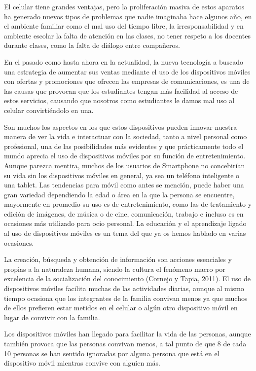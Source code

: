 \documentclass[10pt,a4paper]{article}
\begin{document}
El celular tiene grandes ventajas, pero la proliferaci{\'o}n masiva de estos aparatos ha generado nuevos tipos de problemas que nadie imaginaba hace algunos a{\~n}o, en el ambiente familiar como el mal uso del tiempo libre, la irresponsabilidad y en ambiente escolar la falta de atenci{\'o}n en las clases, no tener respeto a los docentes durante clases, como la falta de di{\'a}logo entre compa{\~n}eros.

En el pasado como hasta ahora en la actualidad, la nueva tecnolog{\'i}a a buscado una estrategia de aumentar sus ventas mediante el uso de los dispositivos m{\'o}viles con ofertas y promociones que ofrecen las empresas de comunicaciones, es una de las causas que provocan que los estudiantes tengan m{\'a}s facilidad al acceso de estos servicios, causando que nosotros como estudiantes le damos mal uso al celular convirti{\'e}ndolo en una. 

Son muchos los aspectos en los que estos dispositivos pueden innovar nuestra manera de ver la vida e interactuar con la sociedad, tanto a nivel personal como profesional, una de las posibilidades m{\'a}s evidentes y que pr{\'a}cticamente todo el mundo aprecia el uso de dispositivos m{\'o}viles por su funci{\'o}n de entretenimiento. Aunque parezca mentira, muchos de los usuarios de Smartphone no concebir{\'i}an su vida sin los dispositivos m{\'o}viles en general, ya sea un tel{\'e}fono inteligente o una tablet. Las tendencias  para m{\'o}vil como antes se menci{\'o}n, puede haber una gran variedad dependiendo la edad o {\'a}rea en la que la persona se encuentre,  mayormente en promedio su uso es de entretenimiento, como las de tratamiento y edici{\'o}n de im{\'a}genes, de m{\'u}sica o de cine, comunicaci{\'o}n, trabajo e incluso es en ocasiones m{\'a}s utilizado para ocio personal. La educaci{\'o}n y el aprendizaje ligado al uso de dispositivos m{\'o}viles es un tema del que ya os hemos hablado en varias ocasiones.

La creaci{\'o}n, b{\'u}squeda y obtenci{\'o}n de informaci{\'o}n son acciones esenciales y propias a la naturaleza humana, siendo la cultura el fen{\'o}meno macro por excelencia de la socializaci{\'o}n del conocimiento (Cornejo y Tapia, 2011).
El uso de dispositivos m{\'o}viles facilita muchas de las actividades diarias, aunque al mismo tiempo ocasiona que los integrantes de la familia convivan menos ya que muchos de ellos prefieren estar metidos en el celular o alg{\'u}n otro dispositivo m{\'o}vil en lugar de convivir con la familia.

Los dispositivos m{\'o}viles han llegado para facilitar la vida de las personas, aunque tambi{\'e}n provoca que las personas convivan menos, a tal punto de que 8 de cada 10 personas se han sentido ignoradas por alguna persona que est{\'a} en el dispositivo m{\'o}vil mientras convive con alguien m{\'a}s.
\end{document}
